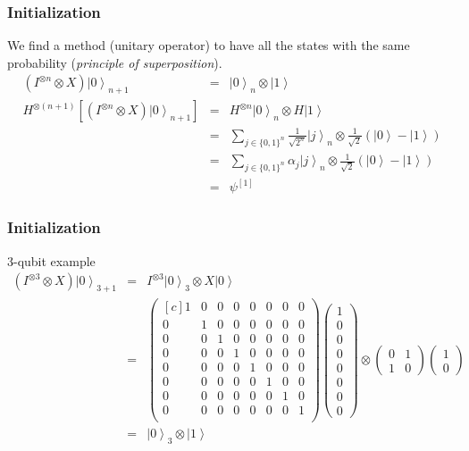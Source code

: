 \begin{frame}
\frametitle{Initialization}
We find a method (unitary operator) to have all the states with the same probability (\textit{principle of superposition}). 
\pause
\begin{eqnarray}
(I^{\otimes n}\otimes X)\left.|0\right\rangle _{n+1}&=&\left.|0\right\rangle _{n}\otimes\left.|1\right\rangle \nonumber\\
H^{\otimes\left(n+1\right)}\left[(I^{\otimes n}\otimes X)\left.|0\right\rangle _{n+1}\right]&=&H^{\otimes n}\left.|0\right\rangle _{n}\otimes H\left.|1\right\rangle \nonumber\\
&=&\sum_{j\in\{0,1\}^{n}}\frac{1}{\sqrt{2^{n}}}\left.|j\right\rangle _{n}\otimes\frac{1}{\sqrt{2}}\left(\left.|0\right\rangle -\left.|1\right\rangle \right)\nonumber\\
&=&\sum_{j\in\{0,1\}^{n}}\alpha_{j}\left.|j\right\rangle _{n}\otimes\frac{1}{\sqrt{2}}\left(\left.|0\right\rangle -\left.|1\right\rangle \right)\nonumber\\
&=&\psi^{[1]}\nonumber
\end{eqnarray}
\end{frame}

\begin{frame}
\frametitle{Initialization}

\begin{exampleblock}{3-qubit example}
\begin{eqnarray}
(I^{\otimes3}\otimes X)\left.|0\right\rangle _{3+1}&=&I^{\otimes3}\left.|0\right\rangle _{3}\otimes X\left.|0\right\rangle \nonumber\\
&=&\begin{pmatrix*}[c]
1&0&0&0&0&0&0&0\\
0&1&0&0&0&0&0&0\\
0&0&1&0&0&0&0&0\\
0&0&0&1&0&0&0&0\\
0&0&0&0&1&0&0&0\\
0&0&0&0&0&1&0&0\\
0&0&0&0&0&0&1&0\\
0&0&0&0&0&0&0&1\\
\end{pmatrix*}\left(\begin{array}{c}
1\\
0\\
0\\
0\\
0\\
0\\
0\\
0
\end{array}\right)\otimes\left(\begin{array}{cc}
0 & 1\\
1 & 0
\end{array}\right)\left(\begin{array}{c}
1\\
0
\end{array}\right)\nonumber\\
&=&\left.|0\right\rangle_3 \otimes\left.|1\right\rangle \nonumber
\end{eqnarray}
\end{exampleblock}


\end{frame}

